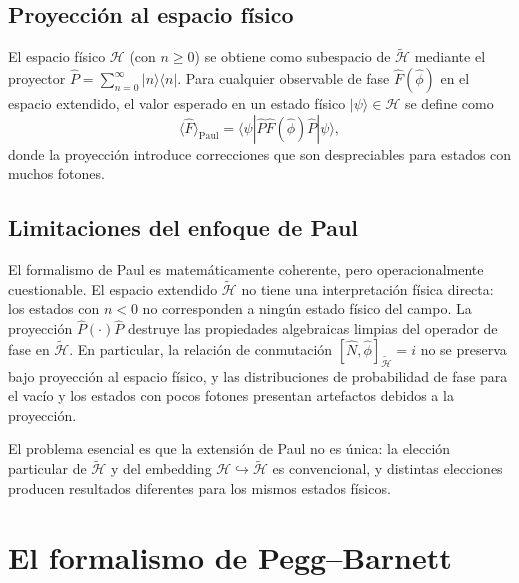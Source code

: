                 \subsection{Proyección al espacio físico}
                
                    El espacio físico $\mathcal{H}$ (con $n \geq 0$) se obtiene como subespacio de $\tilde{\mathcal{H}}$ mediante el proyector $\hat{P} = \sum_{n=0}^{\infty}|n\rangle\langle n|$. Para cualquier observable de fase $\hat{F}(\hat{\phi})$ en el espacio extendido, el valor esperado en un estado físico $|\psi\rangle \in \mathcal{H}$ se define como
                    \begin{equation}
                        \langle\hat{F}\rangle_{\text{Paul}} = \langle\psi|\hat{P}\hat{F}(\hat{\phi})\hat{P}|\psi\rangle,
                    \end{equation}
                    donde la proyección introduce correcciones que son despreciables para estados con muchos fotones.
 
        \subsection{Limitaciones del enfoque de Paul}
        
            El formalismo de Paul es matemáticamente coherente, pero operacionalmente cuestionable. El espacio extendido $\tilde{\mathcal{H}}$ no tiene una interpretación física directa: los estados con $n < 0$ no corresponden a ningún estado físico del campo. La proyección $\hat{P}(\cdot)\hat{P}$ destruye las propiedades algebraicas limpias del operador de fase en $\tilde{\mathcal{H}}$. En particular, la relación de conmutación $[\hat{N}, \hat{\phi}]_{\tilde{\mathcal{H}}} = i$ no se preserva bajo proyección al espacio físico, y las distribuciones de probabilidad de fase para el vacío y los estados con pocos fotones presentan artefactos debidos a la proyección.
            
            El problema esencial es que la extensión de Paul no es única: la elección particular de $\tilde{\mathcal{H}}$ y del embedding $\mathcal{H} \hookrightarrow \tilde{\mathcal{H}}$ es convencional, y distintas elecciones producen resultados diferentes para los mismos estados físicos.
 
    \section{El formalismo de Pegg--Barnett}
    

